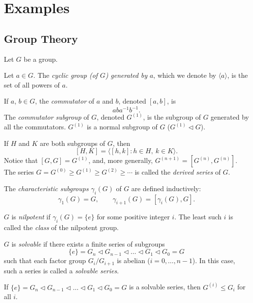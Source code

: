 \documentclass[12pt]{report}
\begin{document}
\chapter{Examples}
\section{Group Theory}
Let $G$ be a group.

\begin{defn}
Let $a\in G$.  The {\it cyclic group (of $G$) generated by $a$}, which we denote by
$\langle a\rangle$, is the set of all powers of $a$.
\end{defn}

\begin{defn}
If $a$, $b\in G$, the {\it commutator} of $a$ and $b$, denoted $[a,b]$, is
\[
aba^{-1}b^{-1}.
\]
The {\it commutator subgroup} of $G$, denoted $G^{(1)}$, is the subgroup of $G$
generated by all the commutators.  $G^{(1)}$ is a normal subgroup of $G$
($G^{(1)} \lhd G$).
\end{defn}

\begin{defn}
If $H$ and $K$ are both subgroups of $G$, then
\[
[H,K] = \langle [h,k]:h\in H,\:k\in K\rangle.
\]
Notice that $[G,G] = G^{(1)}$, and, more generally, $G^{(n+1)} = [G^{(n)}, G^{(n)}]$.
The series $G = G^{(0)} \geq G^{(1)} \geq G^{(2)} \geq\cdots$ is called the {\it derived series}
of $G$.
\end{defn}

\begin{defn}
The {\it characteristic subgroups $\gamma_i(G)$} of $G$ are defined inductively:
\[
\gamma_1(G) = G,\qquad\gamma_{i+1}(G) = [\gamma_i(G),G].
\]
\end{defn}

\begin{defn}
$G$ is {\it nilpotent} if $\gamma_i(G) = \{e\}$ for some positive integer $i$.
The least such $i$ is called the {\it class} of the nilpotent group.
\end{defn}

\begin{defn}
$G$ is {\it solvable} if there exists a finite series of subgroups
\[
\{e\} = G_n \lhd G_{n-1} \lhd \dots \lhd G_1 \lhd G_0 = G
\]
such that each factor group $G_i/G_{i+1}$ is abelian ($i=0,\dots ,n-1$).
In this case, such a series is called a {\it solvable series}.
\end{defn}

\begin{lemma}
If $\{e\} = G_n \lhd G_{n-1} \lhd \dots \lhd G_1 \lhd G_0 = G$ is a solvable series,
then $G^{(i)} \leq G_i$ for all $i$.
\end{lemma}
\end{document}
